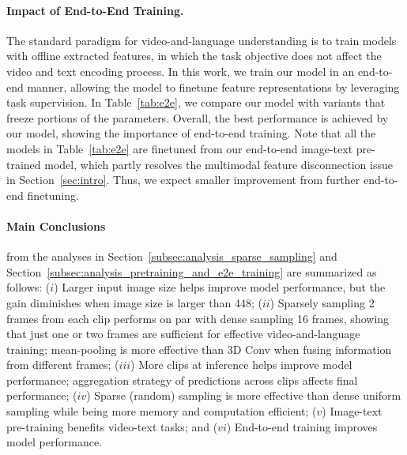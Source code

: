 \paragraph{Impact of End-to-End Training.} 
The standard paradigm for video-and-language understanding is to train models with offline extracted features, in which the task objective does not affect the video and text encoding process. 
In this work, we train our model in an end-to-end manner, allowing the model to finetune feature representations by leveraging task supervision. 
In Table~\ref{tab:e2e}, we compare our model with variants that freeze portions of the parameters.
Overall, the best performance is achieved by our model, showing the importance of end-to-end training.
Note that all the models in Table~\ref{tab:e2e} are finetuned from our end-to-end image-text  pre-trained model, which partly resolves the multimodal feature disconnection issue in Section~\ref{sec:intro}. 
Thus, we expect smaller improvement from further end-to-end finetuning.



\paragraph{Main Conclusions} from the analyses in Section~\ref{subsec:analysis_sparse_sampling} and Section~\ref{subsec:analysis_pretraining_and_e2e_training} are summarized as follows:
($i$) Larger input image size helps improve model performance, but the gain diminishes when image size is larger than 448;
($ii$) Sparsely sampling 2 frames from each clip performs on par with dense sampling 16 frames, showing that just one or two frames are sufficient for effective video-and-language training; 
mean-pooling is more effective than 3D Conv when fusing information from different frames;
($iii$) More clips at inference helps improve model performance; aggregation strategy of predictions across clips affects final performance;
($iv$) Sparse (random) sampling is more effective than dense uniform sampling while being more memory and computation efficient;
($v$) Image-text pre-training benefits video-text tasks; 
and ($vi$) End-to-end training improves model performance.



